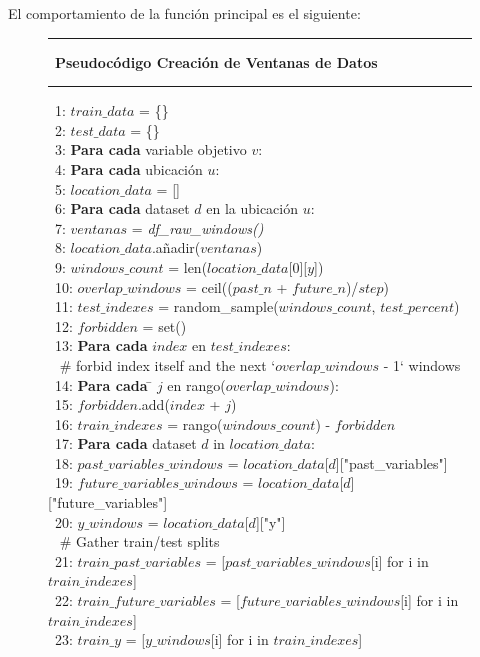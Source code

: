 \bigskip
El comportamiento de la función principal es el siguiente:

\begin{figure}[H]
{\small
 \hrule \
 {\bf\small Pseudocódigo Creación de Ventanas de Datos}
 \hrule
\begin{center}
\begin{tabbing}
\ 1: $train\_data$ = \{\} \\
\ 2: $test\_data$ = \{\} \\
\ 3: {\bf Par}\={\bf a cada} variable objetivo $v$: \\
\ 4: \> {\bf Par}\={\bf a cada} ubicación $u$:  \\
\ 5: \> $location\_data$ = [] \\
\ 6: \> \> {\bf Par}\={\bf a cada} dataset $d$ en la ubicación $u$:  \\
\ 7: \> \> \> $ventanas$ =  \textit{df\_raw\_windows()} \\
\ 8: \> \> \> $location\_data$.añadir($ventanas$) \\
\ 9: \> \> $windows\_count$ = len($location\_data$[0][$y$]) \\
\ 10: \> \> $overlap\_windows$ = ceil(($past\_n$ + $future\_n$)/$step$) \\
\ 11: \> \> $test\_indexes$ = random\_sample($windows\_count$, $test\_percent$) \\
\ 12: \> \> $forbidden$ = set() \\
\ 13: \> \> {\bf Par}\={\bf a cada} $index$ en $test\_indexes$: \\
\     \> \>     \# forbid index itself and the next `$overlap\_windows$ - 1` windows \\
\ 14: \> \> \>   {\bf Par}\={\bf a cada} \= $j$ en rango($overlap\_windows$): \\
\ 15: \> \> \> \>     $forbidden$.add($index$ + $j$) \\
\ 16: \> \> $train\_indexes$ = rango($windows\_count$) - $forbidden$ \\

\ 17: \> \> {\bf Par}\={\bf a cada} dataset $d$ in $location\_data$: \\
\ 18: \> \> \> $past\_variables\_windows$ = $location\_data$[$d$]["past\_variables"] \\
\ 19: \> \> \> $future\_variables\_windows$ = $location\_data$[$d$]["future\_variables"] \\
\ 20: \> \> \> $y\_windows$ = $location\_data$[$d$]["y"] \\
\     \> \> \> \# Gather train/test splits \\
\ 21: \> \> \> $train\_past\_variables$ = [$past\_variables\_windows$[i] for i in $train\_indexes$] \\
\ 22: \> \> \> $train\_future\_variables$ = [$future\_variables\_windows$[i] for i in $train\_indexes$] \\
\ 23: \> \> \> $train\_y$ = [$y\_windows$[i] for i in $train\_indexes$] \\


\end{tabbing}
\end{center}}
\end{figure}
